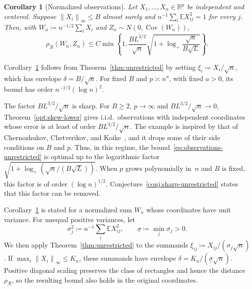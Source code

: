 \documentclass[11pt,letterpaper]{article}
\newenvironment{recovered}{}{}
\newtheorem{corollary}{Corollary}
\theoremstyle{remark}
\newcommand{\E}{\mathbb E}
\newcommand{\R}{\mathbb R}
\newcommand{\Cov}{\operatorname{Cov}}
\newcommand{\norm}[1]{\left\lVert#1\right\rVert}
\newcommand{\rh}{\rho_{\mathcal R}}
\begin{document}
\begin{corollary}[Normalized observations]\label{cor:observations}
Let \(X_1,\ldots,X_n\in\R^p\) be independent and centered. Suppose
\(\norm{X_i}_\infty\le B\) almost surely and
\(n^{-1}\sum_i\E X_{ij}^2=1\) for every \(j\). Then, with
\(W_n\coloneqq n^{-1/2}\sum_iX_i\) and \(Z_n\sim N(0,\Cov(W_n))\),
\begin{equation}
 \rh(W_n,Z_n)\le C\min\!\left\{1,
 \frac{B L^{3/2}}{\sqrt n}
 \sqrt{1+\log_+\frac{\sqrt n}{B\sqrt L}}\right\}.
 \label{eq:observations-unrestricted}
\end{equation}
\end{corollary}

Corollary~\ref{cor:observations} follows from Theorem~\ref{thm:unrestricted}
by setting \(\xi_i\coloneqq X_i/\sqrt n\), which has envelope \(\delta=B/\sqrt n\). For
fixed \(B\) and \(p\asymp n^a\), with fixed \(a>0\), its bound has
order \(n^{-1/2}(\log n)^2\).

The factor \(BL^{3/2}/\sqrt n\) is sharp. For \(B\ge2\), \(p\to\infty\) and
\(BL^{3/2}/\sqrt n\to0\), Theorem~\ref{opt:skew-lower} gives i.i.d.\ observations
with independent coordinates whose error is at least of order
\(BL^{3/2}/\sqrt n\). The example is inspired by that of Chernozhukov,
Chetverikov, and Koike~\cite[Proposition~2.1]{CCK}, and it drops some of their
side conditions on \(B\) and \(p\). Thus, in this regime, the
bound~\eqref{eq:observations-unrestricted} is optimal up to the logarithmic
factor \(\sqrt{1+\log_+(\sqrt n/(B\sqrt L))}\). When \(p\) grows polynomially
in~\(n\) and \(B\) is fixed, this factor is of order \((\log n)^{1/2}\).
Conjecture~\ref{conj:sharp-unrestricted} states that this factor can be removed.

\begin{recovered}
Corollary~\ref{cor:observations} is stated for a normalized sum \(W_n\)
whose coordinates have unit variance. For unequal positive variances, let
\[
 \sigma_j^2\coloneqq n^{-1}\sum_i\E X_{ij}^2,
 \qquad
 \underline\sigma\coloneqq \min_j\sigma_j>0.
\]
We then apply Theorem~\ref{thm:unrestricted} to the summands
\(\xi_{ij}\coloneqq X_{ij}/(\sigma_j\sqrt n)\). If
\(\max_i\norm{X_i}_\infty\le K_n\), these summands have
envelope \(\delta=K_n/(\underline\sigma\sqrt n)\).
Positive diagonal scaling preserves the class of rectangles and hence
the distance \(\rh\), so the resulting bound also holds in the
original coordinates.
\end{recovered}
\end{document}
